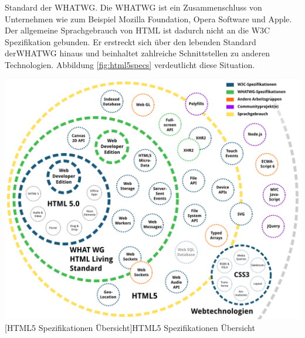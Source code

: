 \documentclass[12pt,a4paper,bibliography=totocnumbered,listof=totocnumbered]{scrartcl}
\begin{document}
Standard\grqq{} der \ac{WHATWG}. Die \ac{WHATWG} ist ein Zusammenschluss von Unternehmen wie zum Beispiel Mozilla Foundation, Opera Software und Apple. Der allgemeine Sprachgebrauch von \ac{HTML} ist dadurch nicht an die \ac{W3C} Spezifikation gebunden. Er erstreckt sich über den \glqq lebenden Standard\grqq{} der\ac{WHATWG} hinaus und beinhaltet zahlreiche Schnittstellen zu anderen Technologien. Abbildung \ref{fig:html5specs} verdeutlicht diese Situation.

	\vspace{1em}
	\begin{minipage}{\linewidth}
		\centering
		\includegraphics[width=0.87\linewidth]{images/html5_specs.png}
		[HTML5 Spezifikationen Übersicht]{HTML5 Spezifikationen Übersicht\cite{PeteKroe2014}}
		\label{fig:html5specs}
	\end{minipage}
\end{document}
